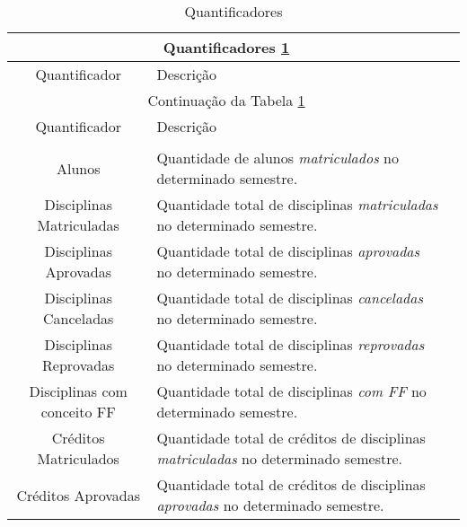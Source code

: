 \documentclass[cic,tc]{iiufrgs}
\begin{document}
   \begin{longtable}[c]{|c|p{10cm}|p{2cm}|}
    \caption{Quantificadores \label{tabQuantificadores}}\\

    \hline
    \multicolumn{2}{|c|}{Quantificadores \ref{tabQuantificadores}}\\
    \hline
    Quantificador & Descrição\\
    \hline
    \endfirsthead
    
    \hline
    \multicolumn{2}{|c|}{Continuação da Tabela \ref{tabQuantificadores}}\\
    \hline
    Quantificador & Descrição\\
    \hline
    \endhead
    
    \hline
    \endfoot
    
    \hline
    \multicolumn{2}{| c |}{Fim da Tabela \ref{tabQuantificadores}}\\
    \hline\hline
    \endlastfoot
    
        Alunos &   
        Quantidade de alunos \textit{matriculados} no determinado semestre. \\ \hline 
        
        Disciplinas Matriculadas &   
        Quantidade total de disciplinas \textit{matriculadas} no determinado semestre. \\ \hline
        
        Disciplinas Aprovadas &   
        Quantidade total de disciplinas \textit{aprovadas} no determinado semestre. \\ \hline
        
        Disciplinas Canceladas &   
        Quantidade total de disciplinas \textit{canceladas} no determinado semestre. \\ \hline
        
        Disciplinas Reprovadas &   
        Quantidade total de disciplinas \textit{reprovadas} no determinado semestre. \\ \hline
        
        Disciplinas com conceito FF &   
        Quantidade total de disciplinas \textit{com FF} no determinado semestre. \\ \hline
        
        
        Créditos Matriculados &   
        Quantidade total de créditos de disciplinas \textit{matriculadas} no determinado semestre. \\ \hline
        
        Créditos Aprovadas &   
        Quantidade total de créditos de disciplinas \textit{aprovadas} no determinado semestre. \\ \hline
        

\end{longtable}
\end{document}
